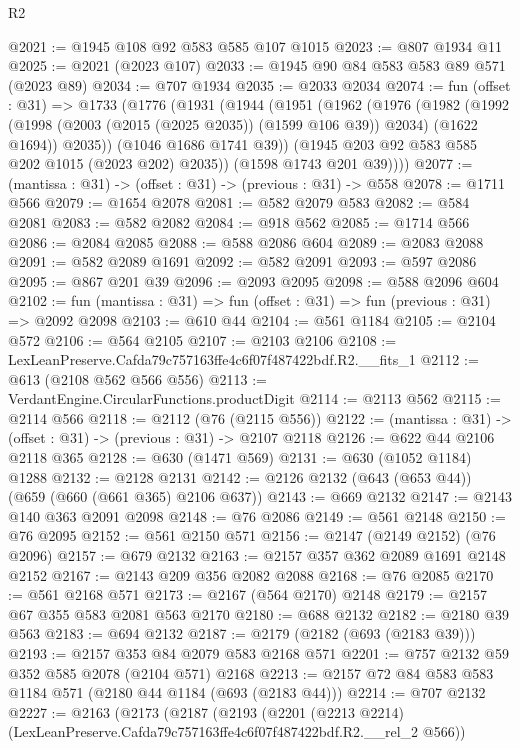 \begin{lexlean}{R2}
\begin{coremodule}
@2021 := @1945 @108 @92 @583 @585 @107 @1015
@2023 := @807 @1934 @11
@2025 := @2021 (@2023 @107)
@2033 := @1945 @90 @84 @583 @583 @89 @571 (@2023 @89)
@2034 := @707 @1934
@2035 := @2033 @2034
@2074 := fun (offset : @31) =>
  @1733
    (@1776
      (@1931
        (@1944
          (@1951
            (@1962
              (@1976
                (@1982
                  (@1992 (@1998 (@2003 (@2015 (@2025 @2035)) (@1599 @106 @39)) @2034) (@1622 @1694))
                  @2035))
              (@1046 @1686 @1741 @39))
            (@1945 @203 @92 @583 @585 @202 @1015 (@2023 @202) @2035))
          (@1598 @1743 @201 @39))))
@2077 := (mantissa : @31) -> (offset : @31) -> (previous : @31) -> @558
@2078 := @1711 @566
@2079 := @1654 @2078
@2081 := @582 @2079 @583
@2082 := @584 @2081
@2083 := @582 @2082
@2084 := @918 @562
@2085 := @1714 @566
@2086 := @2084 @2085
@2088 := @588 @2086 @604
@2089 := @2083 @2088
@2091 := @582 @2089 @1691
@2092 := @582 @2091
@2093 := @597 @2086
@2095 := @867 @201 @39
@2096 := @2093 @2095
@2098 := @588 @2096 @604
@2102 := fun (mantissa : @31) => fun (offset : @31) => fun (previous : @31) => @2092 @2098
@2103 := @610 @44
@2104 := @561 @1184
@2105 := @2104 @572
@2106 := @564 @2105
@2107 := @2103 @2106
@2108 := LexLeanPreserve.Cafda79c757163ffe4c6f07f487422bdf.R2.__fits_1
@2112 := @613 (@2108 @562 @566 @556)
@2113 := VerdantEngine.CircularFunctions.productDigit
@2114 := @2113 @562
@2115 := @2114 @566
@2118 := @2112 (@76 (@2115 @556))
@2122 := (mantissa : @31) -> (offset : @31) -> (previous : @31) -> @2107 @2118
@2126 := @622 @44 @2106 @2118 @365
@2128 := @630 (@1471 @569)
@2131 := @630 (@1052 @1184) @1288
@2132 := @2128 @2131
@2142 := @2126 @2132 (@643 (@653 @44)) (@659 (@660 (@661 @365) @2106 @637))
@2143 := @669 @2132
@2147 := @2143 @140 @363 @2091 @2098
@2148 := @76 @2086
@2149 := @561 @2148
@2150 := @76 @2095
@2152 := @561 @2150 @571
@2156 := @2147 (@2149 @2152) (@76 @2096)
@2157 := @679 @2132
@2163 := @2157 @357 @362 @2089 @1691 @2148 @2152
@2167 := @2143 @209 @356 @2082 @2088
@2168 := @76 @2085
@2170 := @561 @2168 @571
@2173 := @2167 (@564 @2170) @2148
@2179 := @2157 @67 @355 @583 @2081 @563 @2170
@2180 := @688 @2132
@2182 := @2180 @39 @563
@2183 := @694 @2132
@2187 := @2179 (@2182 (@693 (@2183 @39)))
@2193 := @2157 @353 @84 @2079 @583 @2168 @571
@2201 := @757 @2132 @59 @352 @585 @2078 (@2104 @571) @2168
@2213 := @2157 @72 @84 @583 @583 @1184 @571 (@2180 @44 @1184 (@693 (@2183 @44)))
@2214 := @707 @2132
@2227 := @2163
    (@2173
      (@2187
        (@2193
          (@2201 (@2213 @2214) (LexLeanPreserve.Cafda79c757163ffe4c6f07f487422bdf.R2.__rel_2 @566))

\end{coremodule}
\end{lexlean}
